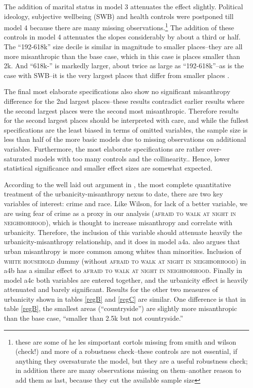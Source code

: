 \documentclass[10pt, letterpaper]{article}
\begin{document}
\begin{spacing}{1.4}
The addition of marital status in model 3 attenuates the effect slightly. Political ideology, subjective wellbeing (SWB) and health controls were postponed
till model 4 because there are many missing observations.\footnote{these are some of he les simportant cortols missing from smith and
wilson (check!) and more of a robustness check--these controls are not
essential, if anything they oversaturate the model, but they are a useful
robustness check; in addition there are many observations missing on
them--another reason to add them as last, because they cut the available sample size
} The addition of these controls in model 4 attenuates the slopes considerably by about a third or half. The ``192-618k'' size decile is similar in magnitude to smaller places--they are all  more misanthropic than the base case, which in this case is places smaller than 2k. And ``618k-'' is markedly larger, about twice as large as ``192-618k''--as is the case with SWB--it is the very largest places that differ from smaller places \citep{aokCityBook15}. 


The final most elaborate specifications also show no significant misanthropy difference for the 2nd largest places--these results contradict earlier results where the second largest places were the second most misanthropic. Therefore results for the second largest places should be interpreted with care, and while the fullest specifications are the least biased in terms of omitted variables, the sample size is less than half of the more basic models due to missing observations on additional variables. Furthermore, the most elaborate specifications are rather over-saturated models with too many controls and the collinearity.. Hence, lower statistical significance and smaller effect sizes are somewhat expected. 

According to the well laid out argument in \citet{wilson85},  the most complete
quantitative treatment of the urbanicity-misanthropy nexus to date, there
are two key variables of interest: crime and race. Like Wilson, for lack of a
better variable, we are using fear of crime as a proxy in our analysis
(\textsc{afraid to walk at night in neighborhood}), which is thought to increase
misanthropy and correlate with urbanicity. Therefore, the inclusion of this
variable should attenuate heavily the urbanicity-misanthropy relationship, and
it does in model a4a. \citet{wilson85} also argues that urban misanthropy is
more common among  whites than minorities. Inclusion of \textsc{white household} dummy 
 (without \textsc{afraid to walk at night in neighborhood}) in a4b has a similar effect to \textsc{afraid to walk at night in neighborhood}. 
 Finally in model a4c both variables are entered together, and the urbanicity effect is heavily attenuated and barely significant. Results for the other two measures of urbanicity shown in tables \ref{regB} and \ref{regC} are similar. One difference is that in table \ref{regB}, the smallest areas (``countryside'') are slightly more misanthropic than the base case, ``smaller than 2.5k but not countryside.''


\end{spacing}
\end{document}
